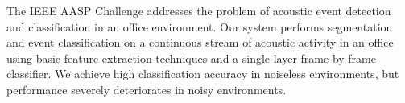 The IEEE AASP Challenge addresses the problem of acoustic event detection and classification in an office environment. Our system performs segmentation and event classification on a continuous stream of acoustic activity in an office using basic feature extraction techniques and a single layer frame-by-frame classifier. We achieve high classification accuracy in noiseless environments, but performance severely deteriorates in noisy environments.

